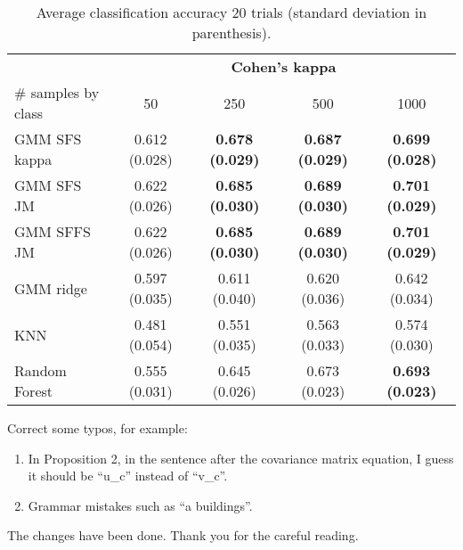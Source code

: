 \documentclass[a4paper,10pt,DIV=16]{scrartcl}
\begin{document}
\begin{table}[!t]
    \centering
    \caption{Average classification accuracy 20 trials (standard deviation in parenthesis).\label{tab:aisa-otbsimu}}
    \begin{tabular}{lcccc}\toprule
         & \multicolumn{4}{c}{\bfseries Cohen's kappa} \\ \cmidrule{2-5}
        \# samples by class & 50 & 250 & 500 & 1000 \\ \midrule

        GMM SFS kappa &  0.612 (0.028) & {\bfseries 0.678 (0.029)} & {\bfseries 0.687 (0.029)} & {\bfseries 0.699 (0.028)} \\
        GMM SFS JM &     0.622 (0.026) & {\bfseries 0.685 (0.030)} & {\bfseries 0.689 (0.030)} & {\bfseries 0.701 (0.029)} \\
        GMM SFFS JM &    0.622 (0.026) & {\bfseries 0.685 (0.030)} & {\bfseries 0.689 (0.030)} & {\bfseries 0.701 (0.029)} \\
        GMM ridge &      0.597 (0.035) & 0.611 (0.040) & 0.620 (0.036) & 0.642 (0.034) \\
        KNN &            0.481 (0.054) & 0.551 (0.035) & 0.563 (0.033) & 0.574 (0.030) \\
        Random Forest &  0.555 (0.031) & 0.645 (0.026) & 0.673 (0.023) & {\bfseries 0.693 (0.023)} \\
        \bottomrule
    \end{tabular}
\end{table}

\begin{revbox}
  Correct some typos, for example:
  \begin{enumerate}
    \item In Proposition 2, in the sentence after the covariance matrix equation, I guess it should be ``u\_c'' instead of ``v\_c''.
    \item Grammar mistakes such as ``a buildings''.
  \end{enumerate}
  \begin{resbox}
    The changes have been done. Thank you for the careful reading.
    
  \end{resbox}
\end{revbox}
\end{document}
